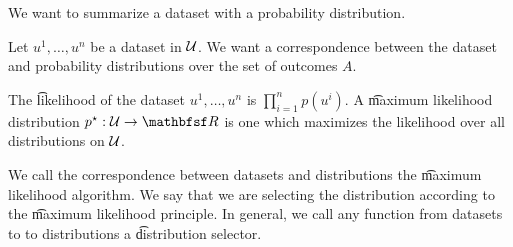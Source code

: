 
We want to summarize a dataset with a probability distribution.


Let $u^1, \dots, u^n$ be a dataset in $\mathcal{U}$.
We want a correspondence between the dataset and probability distributions over the set of outcomes $A$.

The \t{likelihood} of the dataset $u^1, \dots, u^n$ is $\prod_{i = 1}^{n} p(u^i)$.
A \t{maximum likelihood distribution} $p^\star: \CU \to \R$ is one which maximizes the likelihood over all distributions on $\mathcal{U}$.

We call the correspondence between datasets and distributions the \t{maximum likelihood algorithm}.
We say that we are selecting the distribution according to the \t{maximum likelihood principle}.
In general, we call any function from datasets to to distributions a \t{distribution selector}.

\blankpage
